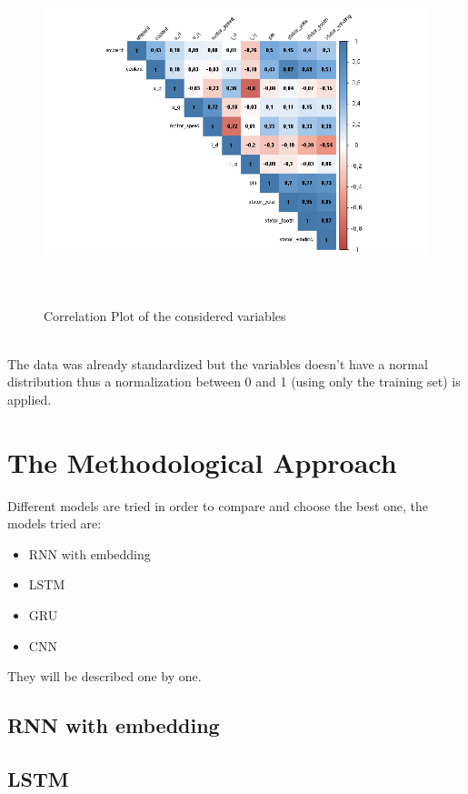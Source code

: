 \begin{figure}[!h]
    \centering
    \includegraphics[width=\linewidth, height=10cm]{imgs/corrplot.png}
    \caption{Correlation Plot of the considered variables}
    \label{fig:corrplot}
\end{figure}\\
The data was already standardized but the variables doesn't have a normal distribution thus a normalization between 0 and 1 (using only the training set) is applied.

\section{The Methodological Approach}

Different models are tried in order to compare and choose the best one, the models tried are:
\begin{itemize}[topsep=0ex, noitemsep]
    \item RNN with embedding 
    \item LSTM
    \item GRU
    \item CNN
\end{itemize}
They will be described one by one.

\subsection{RNN with embedding}

\subsection{LSTM}

